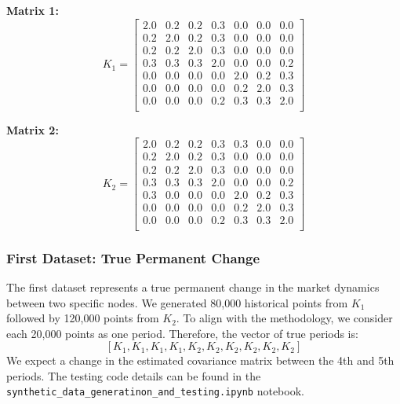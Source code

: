 \documentclass{article}
\begin{document}
\textbf{Matrix 1:}
\[
K_1 = \begin{bmatrix}
2.0 & 0.2 & 0.2 & 0.3 & 0.0 & 0.0 & 0.0 \\
0.2 & 2.0 & 0.2 & 0.3 & 0.0 & 0.0 & 0.0 \\
0.2 & 0.2 & 2.0 & 0.3 & 0.0 & 0.0 & 0.0 \\
0.3 & 0.3 & 0.3 & 2.0 & 0.0 & 0.0 & 0.2 \\
0.0 & 0.0 & 0.0 & 0.0 & 2.0 & 0.2 & 0.3 \\
0.0 & 0.0 & 0.0 & 0.0 & 0.2 & 2.0 & 0.3 \\
0.0 & 0.0 & 0.0 & 0.2 & 0.3 & 0.3 & 2.0 \\
\end{bmatrix}
\]

\textbf{Matrix 2:}
\[
K_2 = \begin{bmatrix}
2.0 & 0.2 & 0.2 & 0.3 & 0.3 & 0.0 & 0.0 \\
0.2 & 2.0 & 0.2 & 0.3 & 0.0 & 0.0 & 0.0 \\
0.2 & 0.2 & 2.0 & 0.3 & 0.0 & 0.0 & 0.0 \\
0.3 & 0.3 & 0.3 & 2.0 & 0.0 & 0.0 & 0.2 \\
0.3 & 0.0 & 0.0 & 0.0 & 2.0 & 0.2 & 0.3 \\
0.0 & 0.0 & 0.0 & 0.0 & 0.2 & 2.0 & 0.3 \\
0.0 & 0.0 & 0.0 & 0.2 & 0.3 & 0.3 & 2.0 \\
\end{bmatrix}
\]

\subsubsection{First Dataset: True Permanent Change}
The first dataset represents a true permanent change in the market dynamics between two specific nodes. We generated 80,000 historical points from \(K_1\) followed by 120,000 points from \(K_2\). To align with the methodology, we consider each 20,000 points as one period. Therefore, the vector of true periods is:
\[
[K_1, K_1, K_1, K_1, K_2, K_2, K_2, K_2, K_2, K_2]
\]
We expect a change in the estimated covariance matrix between the 4th and 5th periods. The testing code details can be found in the \texttt{synthetic_data_generatinon_and_testing.ipynb} notebook.
\end{document}
